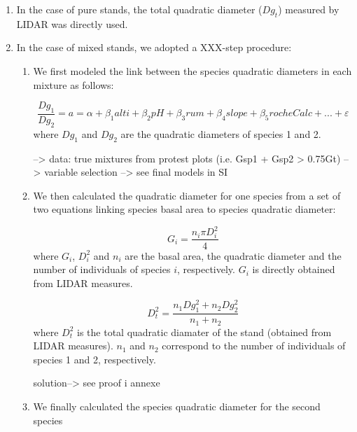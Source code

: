 \documentclass[a4paper]{article}
\begin{document}
\begin{enumerate}
    \item In the case of pure stands, the total quadratic diameter ($Dg_t$) measured by LIDAR was directly used.
    
    \item In the case of mixed stands, we adopted a XXX-step procedure:
    \begin{enumerate}
        \item We first modeled the link between the species quadratic diameters in each mixture as follows:
        
            \begin{equation}\label{}
            \frac{Dg_1}{Dg_2} = a = \alpha + \beta_1 alti + \beta_2 pH +\beta_3 rum +\beta_4 slope +\beta_5 rocheCalc+...+\varepsilon
             \end{equation}
           where $Dg_1$ and $Dg_2$ are the quadratic diameters of species 1 and 2.
           
           --> data: true mixtures from protest plots (i.e. Gsp1 + Gsp2 > 0.75Gt)
           --> variable selection
           --> see final models in SI
        
        \item We then calculated the quadratic diameter for one species from a set of two equations linking species basal area to species quadratic diameter:
        
        \begin{equation}\label{}
      G_i = \frac{n_i\pi D_i^2}{4}
        \end{equation}
        where $G_i$, $D_i^2$ and $n_i$ are the basal area, the quadratic diameter and the number of individuals of species $i$, respectively. $G_i$ is directly obtained from LIDAR measures.

        \begin{equation}\label{}
        D_t^2 = \frac{n_1Dg_1^2 + n_2Dg_2^2}{n_1 + n_2}
        \end{equation}
        where $D_t^2$ is the total quadratic diamater of the stand (obtained from LIDAR measures). $n_1$ and $n_2$ correspond to the number of individuals of species 1 and 2, respectively.

\noindent solution--> see proof i annexe
        
        \item We finally calculated the species quadratic diameter for the second species
    \end{enumerate}
\end{enumerate}
\end{document}
